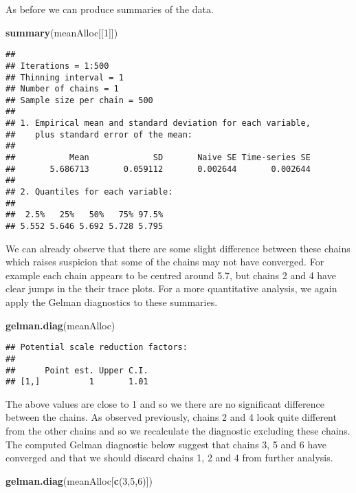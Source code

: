 \documentclass[9pt,a4paper,]{extarticle}
\newenvironment{Shaded}{\begin{snugshade}}{\end{snugshade}}
\newcommand{\DecValTok}[1]{\textcolor[rgb]{0.00,0.00,0.81}{#1}}
\newcommand{\KeywordTok}[1]{\textcolor[rgb]{0.13,0.29,0.53}{\textbf{#1}}}
\newcommand{\NormalTok}[1]{#1}
\begin{document}
As before we can produce summaries of the data.

\begin{Shaded}
\begin{Highlighting}[]
\KeywordTok{summary}\NormalTok{(meanAlloc[[}\DecValTok{1}\NormalTok{]])}
\end{Highlighting}
\end{Shaded}

\begin{verbatim}
## 
## Iterations = 1:500
## Thinning interval = 1 
## Number of chains = 1 
## Sample size per chain = 500 
## 
## 1. Empirical mean and standard deviation for each variable,
##    plus standard error of the mean:
## 
##           Mean             SD       Naive SE Time-series SE 
##       5.686713       0.059112       0.002644       0.002644 
## 
## 2. Quantiles for each variable:
## 
##  2.5%   25%   50%   75% 97.5% 
## 5.552 5.646 5.692 5.728 5.795
\end{verbatim}

We can already observe that there are some slight difference between
these chains which raises suspicion that some of the chains may not have converged.
For example each chain appears to be centred around 5.7, but chains 2 and 4
have clear jumps in the their trace plots. For a more quantitative
analysis, we again apply the Gelman diagnostics to these summaries.

\begin{Shaded}
\begin{Highlighting}[]
\KeywordTok{gelman.diag}\NormalTok{(meanAlloc)}
\end{Highlighting}
\end{Shaded}

\begin{verbatim}
## Potential scale reduction factors:
## 
##      Point est. Upper C.I.
## [1,]          1       1.01
\end{verbatim}

The above values are close to 1 and so we there are no significant difference
between the chains. As observed previously, chains 2 and 4
look quite different from the other chains and so we recalculate the diagnostic
excluding these chains. The computed Gelman diagnostic below suggest that chains 3, 5
and 6 have converged and that we should discard chains 1, 2 and 4 from
further analysis.

\begin{Shaded}
\begin{Highlighting}[]
\KeywordTok{gelman.diag}\NormalTok{(meanAlloc[}\KeywordTok{c}\NormalTok{(}\DecValTok{3}\NormalTok{,}\DecValTok{5}\NormalTok{,}\DecValTok{6}\NormalTok{)])}
\end{Highlighting}
\end{Shaded}
\end{document}
